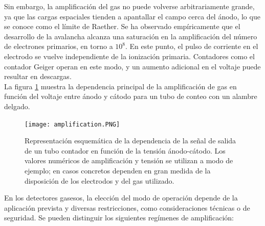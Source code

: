 \documentclass[]{book}
\begin{document}
\noindent Sin embargo, la amplificación del gas no puede volverse arbitrariamente grande, ya que las cargas espaciales tienden a apantallar el campo cerca del ánodo, lo que se conoce como el límite de Raether. Se ha observado empíricamente que el desarrollo de la avalancha alcanza una saturación en la amplificación del número de electrones primarios, en torno a \(10^8\). En este punto, el pulso de corriente en el electrodo se vuelve independiente de la ionización primaria. Contadores como el contador Geiger operan en este modo, y un aumento adicional en el voltaje puede resultar en descargas.\\

\noindent La figura \ref{fig:amplification} muestra la dependencia principal de la amplificación de gas en función del voltaje entre ánodo y cátodo para un tubo de conteo con un alambre delgado. 


\begin{figure}[H]
    \centering
    \texttt{[image: amplification.PNG]}
    \caption{Representación esquemática de la dependencia de la
    señal de salida de un tubo contador en función de la tensión ánodo-cátodo. Los valores numéricos de amplificación y tensión se utilizan a modo de ejemplo; en casos concretos dependen en gran medida de la disposición de los electrodos y del gas utilizado. }
    \label{fig:amplification}
\end{figure}

\noindent En los detectores gasesos, la elección del modo de operación depende de la aplicación prevista y diversas restricciones, como consideraciones técnicas o de seguridad. Se pueden distinguir los siguientes regímenes de amplificación: 
\end{document}
